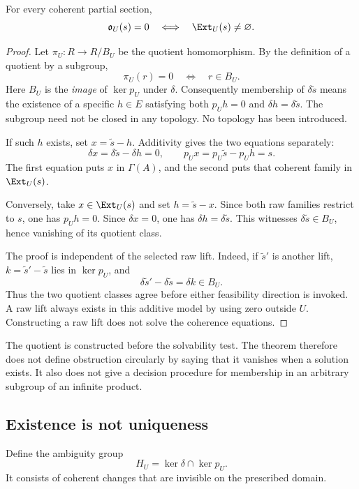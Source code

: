 \begin{theorem}\label{KS09}
For every coherent partial section,
\[
 \mathfrak o_U(s)=0\quad\Longleftrightarrow\quad\Ext_U(s)\ne\varnothing.
\]
\end{theorem}
\begin{proof}
Let $\pi_U:R\to R/B_U$ be the quotient homomorphism. By the definition of a quotient by a subgroup,
\[
 \pi_U(r)=0\quad\Longleftrightarrow\quad r\in B_U.
\]
Here $B_U$ is the \emph{image} of $\ker p_U$ under $\delta$. Consequently membership of $\delta\widetilde s$ means the existence of a specific $h\in E$ satisfying both $p_Uh=0$ and $\delta h=\delta\widetilde s$. The subgroup need not be closed in any topology. No topology has been introduced.

If such $h$ exists, set $x=\widetilde s-h$. Additivity gives the two equations separately:
\[
 \delta x=\delta\widetilde s-\delta h=0,
 \qquad p_Ux=p_U\widetilde s-p_Uh=s.
\]
The first equation puts $x$ in $\Gamma(A)$, and the second puts that coherent family in $\Ext_U(s)$.

Conversely, take $x\in\Ext_U(s)$ and set $h=\widetilde s-x$. Since both raw families restrict to $s$, one has $p_Uh=0$. Since $\delta x=0$, one has $\delta h=\delta\widetilde s$. This witnesses $\delta\widetilde s\in B_U$, hence vanishing of its quotient class.

The proof is independent of the selected raw lift. Indeed, if $\widetilde s'$ is another lift, $k=\widetilde s'-\widetilde s$ lies in $\ker p_U$, and
\[
 \delta\widetilde s'-\delta\widetilde s=\delta k\in B_U.
\]
Thus the two quotient classes agree before either feasibility direction is invoked. A raw lift always exists in this additive model by using zero outside $U$. Constructing a raw lift does not solve the coherence equations.
\end{proof}
The quotient is constructed before the solvability test. The theorem therefore does not define obstruction circularly by saying that it vanishes when a solution exists. It also does not give a decision procedure for membership in an arbitrary subgroup of an infinite product.


\subsection{Existence is not uniqueness}
Define the ambiguity group
\[
 H_U=\ker\delta\cap\ker p_U.
\]
It consists of coherent changes that are invisible on the prescribed domain.

